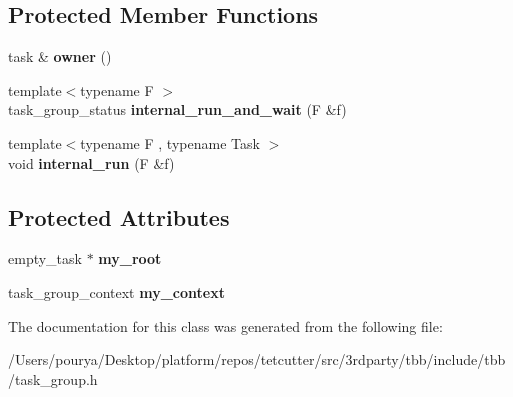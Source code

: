 \subsection*{Protected Member Functions}
\begin{DoxyCompactItemize}
\item 
\hypertarget{classtbb_1_1internal_1_1task__group__base_a4efe5bdeaa3c874a36e7d95d76ad1367}{}task \& {\bfseries owner} ()\label{classtbb_1_1internal_1_1task__group__base_a4efe5bdeaa3c874a36e7d95d76ad1367}

\item 
\hypertarget{classtbb_1_1internal_1_1task__group__base_aef3561e83c11cde7299a34db1064f420}{}{\footnotesize template$<$typename F $>$ }\\task\+\_\+group\+\_\+status {\bfseries internal\+\_\+run\+\_\+and\+\_\+wait} (F \&f)\label{classtbb_1_1internal_1_1task__group__base_aef3561e83c11cde7299a34db1064f420}

\item 
\hypertarget{classtbb_1_1internal_1_1task__group__base_ab57636e45b436a15c7adefb25f9df090}{}{\footnotesize template$<$typename F , typename Task $>$ }\\void {\bfseries internal\+\_\+run} (F \&f)\label{classtbb_1_1internal_1_1task__group__base_ab57636e45b436a15c7adefb25f9df090}

\end{DoxyCompactItemize}
\subsection*{Protected Attributes}
\begin{DoxyCompactItemize}
\item 
\hypertarget{classtbb_1_1internal_1_1task__group__base_a60fb257f34f63428032f93e9b3b50a89}{}empty\+\_\+task $\ast$ {\bfseries my\+\_\+root}\label{classtbb_1_1internal_1_1task__group__base_a60fb257f34f63428032f93e9b3b50a89}

\item 
\hypertarget{classtbb_1_1internal_1_1task__group__base_afa2bb3845517c6b2f9e29a4e3b08a62d}{}task\+\_\+group\+\_\+context {\bfseries my\+\_\+context}\label{classtbb_1_1internal_1_1task__group__base_afa2bb3845517c6b2f9e29a4e3b08a62d}

\end{DoxyCompactItemize}


The documentation for this class was generated from the following file\+:\begin{DoxyCompactItemize}
\item 
/\+Users/pourya/\+Desktop/platform/repos/tetcutter/src/3rdparty/tbb/include/tbb/task\+\_\+group.\+h\end{DoxyCompactItemize}
